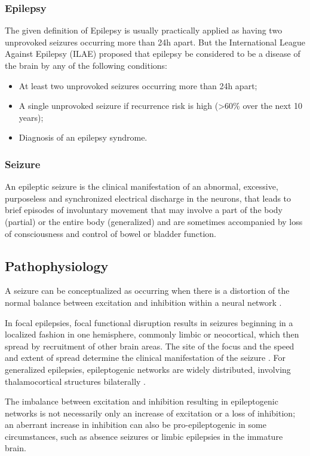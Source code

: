     \subsubsection*{Epilepsy}
    The given definition of Epilepsy is usually practically applied as having two unprovoked seizures occurring more than 24h apart. But the International League Against Epilepsy (ILAE) proposed that epilepsy be considered to be a disease of the brain by any of the following conditions: \cite{defEpilepsy}

    \begin{itemize}
      \item At least two unprovoked seizures occurring more than 24h apart;
      \item A single unprovoked seizure if recurrence risk is high (>60\% over the next 10 years);
      \item Diagnosis of an epilepsy syndrome.
    \end{itemize}
    \subsubsection*{Seizure}
    An epileptic seizure is the clinical manifestation of an abnormal, excessive, purposeless and synchronized electrical discharge in the neurons, that leads to brief episodes of involuntary movement that may involve a part of the body (partial) or the entire body (generalized) and are sometimes accompanied by loss of consciousness and control of bowel or bladder function. \cite{WHO}

  \subsection*{Pathophysiology}
  A seizure can be conceptualized as occurring when there is a distortion of the normal balance between excitation and inhibition within a neural network \cite{pathophysiology}. 
  
  In focal epilepsies, focal functional disruption results in seizures beginning in a localized fashion in one hemisphere,
  commonly limbic or neocortical, which then spread by recruitment of other brain areas. The site of the focus and the speed and extent of spread determine the clinical manifestation of the seizure \cite{DUNCAN2006, classification}. For generalized epilepsies, epileptogenic networks are widely distributed, involving thalamocortical structures bilaterally \cite{classification}.

  The imbalance between excitation and inhibition resulting in epileptogenic networks is not necessarily only an increase of excitation or a loss of inhibition; an aberrant increase in inhibition can also be pro-epileptogenic in some circumstances, such as absence seizures \cite{pinault2005cellular} or limbic epilepsies in the immature brain. \cite{galanopoulou2008gabaa}

